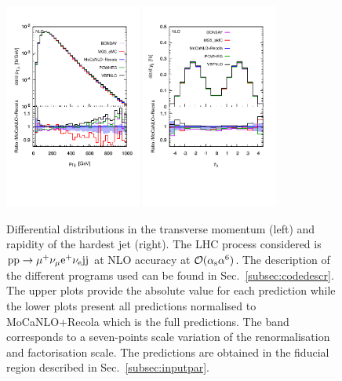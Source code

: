  \begin{figure}[hbt!]
   \centering
   \includegraphics[width=0.4\textwidth,angle=0,clip=true,trim={0.4cm 2cm 0.cm 1.cm}]{figures/NLO/ptj1_NLO.pdf}
   \includegraphics[width=0.4\textwidth,angle=0,clip=true,trim={0.4cm 2cm 0.cm 1.cm}]{figures/NLO/yj1_NLO.pdf}
\caption{\label{fig:distNLO2} Differential distributions in the transverse momentum (left) and rapidity of the hardest jet (right).
The LHC process considered is ${\rm p}{\rm p}\to\mu^+\nu_\mu{\rm e}^+\nu_{\rm e}{\rm j}{\rm j}$ at NLO accuracy at $\mathcal{O}(\alpha_{\rm s}\alpha^6)$.
The description of the different programs used can be found in Sec.~\ref{subsec:codedescr}.
The upper plots provide the absolute value for each prediction while the lower plots present all predictions normalised to {\sc MoCaNLO}+{\sc Recola} which is the full predictions.
The band corresponds to a seven-points scale variation of the renormalisation and factorisation scale.
The predictions are obtained in the fiducial region described in Sec.~\ref{subsec:inputpar}.
}
\end{figure}


